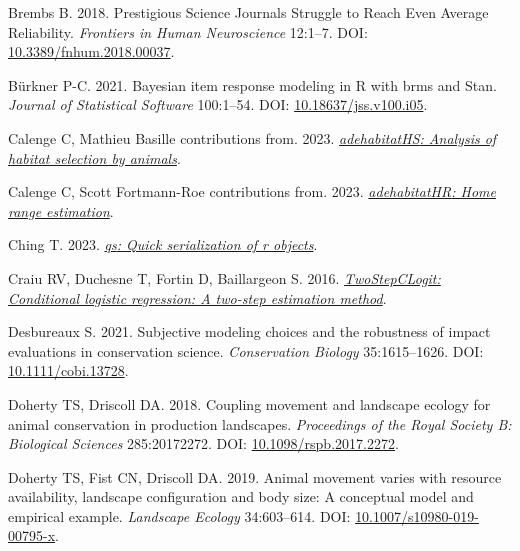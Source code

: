 \documentclass[10pt,a4paper]{article}
\newlength{\cslhangindent}
\newlength{\cslentryspacingunit} %
\newenvironment{CSLReferences}[2] %
 {%
  \setlength{\parindent}{0pt}
  \ifodd #1
  \let\oldpar\par
  \def\par{\hangindent=\cslhangindent\oldpar}
  \fi
  \setlength{\parskip}{#2\cslentryspacingunit}
 }%
 {}
\begin{document}
\begin{CSLReferences}{1}{0}
\leavevmode{}%
Brembs B. 2018. Prestigious {Science} {Journals} {Struggle} to {Reach} {Even} {Average} {Reliability}. \emph{Frontiers in Human Neuroscience} 12:1--7. DOI: \href{https://doi.org/10.3389/fnhum.2018.00037}{10.3389/fnhum.2018.00037}.

\leavevmode{}%
Bürkner P-C. 2021. Bayesian item response modeling in {R} with {brms} and {Stan}. \emph{Journal of Statistical Software} 100:1--54. DOI: \href{https://doi.org/10.18637/jss.v100.i05}{10.18637/jss.v100.i05}.

\leavevmode{}%
Calenge C, Mathieu Basille contributions from. 2023. \emph{\href{https://CRAN.R-project.org/package=adehabitatHS}{{adehabitatHS}: Analysis of habitat selection by animals}}.

\leavevmode{}%
Calenge C, Scott Fortmann-Roe contributions from. 2023. \emph{\href{https://CRAN.R-project.org/package=adehabitatHR}{{adehabitatHR}: Home range estimation}}.

\leavevmode{}%
Ching T. 2023. \emph{\href{https://CRAN.R-project.org/package=qs}{{qs}: Quick serialization of r objects}}.

\leavevmode{}%
Craiu RV, Duchesne T, Fortin D, Baillargeon S. 2016. \emph{\href{https://CRAN.R-project.org/package=TwoStepCLogit}{TwoStepCLogit: Conditional logistic regression: A two-step estimation method}}.

\leavevmode{}%
Desbureaux S. 2021. Subjective modeling choices and the robustness of impact evaluations in conservation science. \emph{Conservation Biology} 35:1615--1626. DOI: \href{https://doi.org/10.1111/cobi.13728}{10.1111/cobi.13728}.

\leavevmode{}%
Doherty TS, Driscoll DA. 2018. Coupling movement and landscape ecology for animal conservation in production landscapes. \emph{Proceedings of the Royal Society B: Biological Sciences} 285:20172272. DOI: \href{https://doi.org/10.1098/rspb.2017.2272}{10.1098/rspb.2017.2272}.

\leavevmode{}%
Doherty TS, Fist CN, Driscoll DA. 2019. Animal movement varies with resource availability, landscape configuration and body size: A conceptual model and empirical example. \emph{Landscape Ecology} 34:603--614. DOI: \href{https://doi.org/10.1007/s10980-019-00795-x}{10.1007/s10980-019-00795-x}.


\end{CSLReferences}
\end{document}
